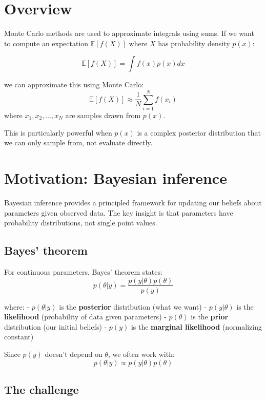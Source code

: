 \documentclass[
  letterpaper,
  DIV=11,
  numbers=noendperiod]{scrreprt}
\begin{document}
\section{Overview}\label{overview-1}

Monte Carlo methods are used to approximate integrals using sums. If we
want to compute an expectation \(\mathbb{E}[f(X)]\) where \(X\) has
probability density \(p(x)\):

\[
\mathbb{E}[f(X)] = \int f(x) p(x) dx
\]

we can approximate this using Monte Carlo: \[
\mathbb{E}[f(X)] \approx \frac{1}{N} \sum_{i=1}^N f(x_i)
\] where \(x_1, x_2, \ldots, x_N\) are samples drawn from \(p(x)\).

This is particularly powerful when \(p(x)\) is a complex posterior
distribution that we can only sample from, not evaluate directly.

\section{Motivation: Bayesian
inference}\label{motivation-bayesian-inference}

Bayesian inference provides a principled framework for updating our
beliefs about parameters given observed data. The key insight is that
parameters have probability distributions, not single point values.

\subsection{Bayes' theorem}\label{bayes-theorem-1}

For continuous parameters, Bayes' theorem states: \[
p(\theta | y) = \frac{p(y | \theta) p(\theta)}{p(y)}
\]

where: - \(p(\theta | y)\) is the \textbf{posterior} distribution (what
we want) - \(p(y | \theta)\) is the \textbf{likelihood} (probability of
data given parameters) - \(p(\theta)\) is the \textbf{prior}
distribution (our initial beliefs) - \(p(y)\) is the \textbf{marginal
likelihood} (normalizing constant)

Since \(p(y)\) doesn't depend on \(\theta\), we often work with: \[
p(\theta | y) \propto p(y | \theta) p(\theta)
\]

\subsection{The challenge}\label{the-challenge}
\end{document}
